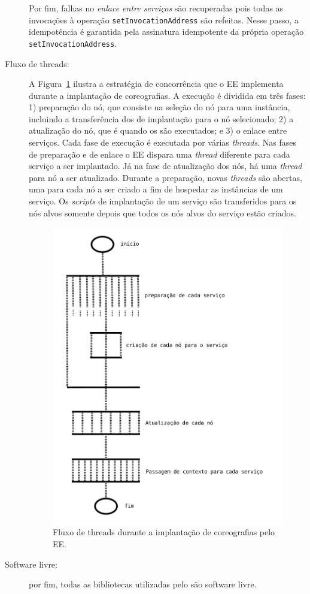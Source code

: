 \begin{description}
Por fim, falhas no \emph{enlace entre serviços} são recuperadas pois todas
as invocações à operação \texttt{setInvocationAddress} são refeitas.
Nesse passo, a idempotência é garantida pela assinatura idempotente
da própria operação \texttt{setInvocationAddress}.

\item [Fluxo de threads:] A Figura~\ref{fig:threads} ilustra a estratégia de concorrência
que o EE implementa durante a implantação de coreografias.
A execução é dividida em três fases: 1) preparação do nó, que consiste na seleção do nó para uma instância, incluindo a transferência dos \scripts de implantação para o nó selecionado;
2) a atualização do nó, que é quando os \scripts são executados;
e 3) o enlace entre serviços.
Cada fase de execução é executada por várias \emph{threads}.
Nas fases de preparação e de enlace o EE dispara uma \emph{thread} diferente para
cada serviço a ser implantado. Já na fase de atualização dos nós, há uma \emph{thread}
para nó a ser atualizado. Durante a preparação, novas \emph{threads} são abertas, 
uma para cada nó a ser criado a fim de hospedar as instâncias de um serviço.
Os \emph{scripts} de implantação de um serviço são transferidos para os nós alvos
somente depois que todos os nós alvos do serviço estão criados.

\begin{figure}[ht]
\centering
\includegraphics[width=0.5\linewidth]{figuras/threads.pdf}
\caption{Fluxo de threads durante a implantação de coreografias pelo EE.}
\label{fig:threads}
\end{figure}

\item [Software livre:] por fim, todas as bibliotecas 
utilizadas pelo \ee são software livre.

\end{description}

